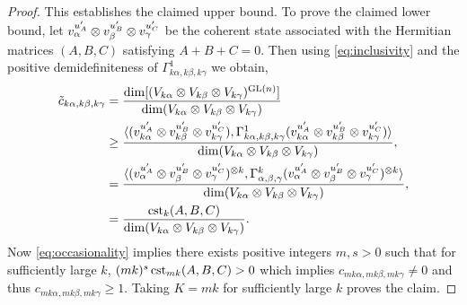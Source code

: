 \documentclass[notitlepage, 10pt]{article}
\begin{document}
\begin{proof}
    This establishes the claimed upper bound.
    To prove the claimed lower bound, let $v_{\alpha}^{u_{A}'} \otimes v_{\beta}^{u_{B}'} \otimes v_{\gamma}^{u_{C}'}$ be the coherent state associated with the Hermitian matrices $(A,B,C)$ satisfying $A+B+C=0$.
    Then using \cref{eq:inclusivity} and the positive demidefiniteness of $\Gamma_{k\alpha,k\beta,k\gamma}^{1}$ we obtain,
    \begin{align}
        \label{eq:tilde_c_k_inclusivity}
        \begin{split}
            \tilde c_{k\alpha, k\beta, k\gamma} 
            &= \frac{\dim[(V_{k\alpha} \otimes V_{k\beta} \otimes V_{k\gamma})^{\operatorname{GL}(n)}]}{\dim(V_{k\alpha} \otimes V_{k\beta} \otimes V_{k\gamma})} \\
            &\geq \frac{\braket{(v_{k\alpha}^{u_A'} \otimes v_{k\beta}^{u_B'} \otimes v_{k\gamma}^{u_C'}), \Gamma_{k\alpha,k\beta,k\gamma}^{1} (v_{k\alpha}^{u_A'} \otimes v_{k\beta}^{u_B'} \otimes v_{k\gamma}^{u_C'})}}{\dim(V_{k\alpha} \otimes V_{k\beta} \otimes V_{k\gamma})}, \\
            &= \frac{\braket{(v_{\alpha}^{u_A'} \otimes v_{\beta}^{u_B'} \otimes v_{\gamma}^{u_C'})^{\otimes k}, \Gamma_{\alpha,\beta,\gamma}^{k} (v_{\alpha}^{u_A'} \otimes v_{\beta}^{u_B'} \otimes v_{\gamma}^{u_C'})^{\otimes k}}}{\dim(V_{k\alpha} \otimes V_{k\beta} \otimes V_{k\gamma})}, \\
            &= \frac{\operatorname{cst}_{k}(A,B,C)}{\dim(V_{k\alpha} \otimes V_{k\beta} \otimes V_{k\gamma})}.
        \end{split}
    \end{align}
    Now \cref{eq:occasionality} implies there exists positive integers $m,s > 0$ such that for sufficiently large $k$, $(mk)^{s} \operatorname{cst}_{mk}(A,B,C) > 0$ which implies $c_{mk\alpha, mk\beta, mk\gamma} \neq 0$ and thus $c_{mk\alpha, mk\beta, mk\gamma} \geq 1$. 
    Taking $K = mk$ for sufficiently large $k$ proves the claim. 
\end{proof}
\end{document}

